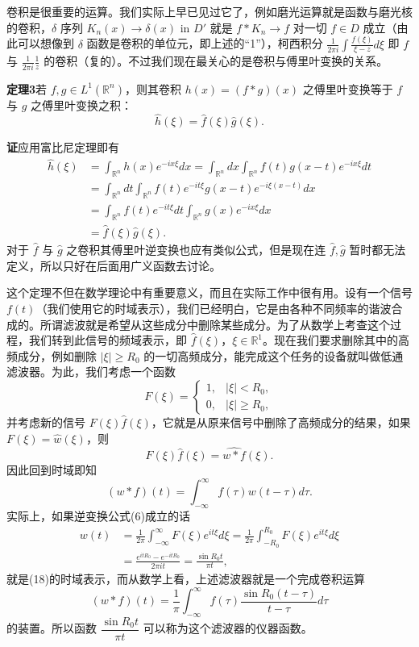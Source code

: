 卷积是很重要的运算。我们实际上早已见过它了，例如磨光运算就是函数与磨光核的卷积，$\delta$ 序列 $K_n(x)\to\delta(x)$ in $D'$ 就是 $f*K_n\to f$ 对一切 $f\in D$ 成立（由此可以想像到 $\delta$ 函数是卷积的单位元，即上述的“1”），柯西积分 $\frac1{2\pi i}\int\frac{f(\xi)}{\xi-z}d\xi$ 即 $f$ 与 $\frac1{2\pi i}\frac1z$ 的卷积（复的）。不过我们现在最关心的是卷积与傅里叶变换的关系。

\noindent\textbf{定理3}\quad 若 $f,g\in L^1(\mathbb R^n)$，则其卷积 $h(x)=(f*g)(x)$ 之傅里叶变换等于 $f$ 与 $g$ 之傅里叶变换之积：
\[
 \widehat h(\xi)=\widehat f(\xi)\widehat g(\xi).
\]

\noindent\textbf{证}\quad 应用富比尼定理即有
\[
 \begin{aligned}
 \widehat h(\xi)
 &=\int_{\mathbb R^n}h(x)e^{-ix\xi}dx
 =\int_{\mathbb R^n}dx\int_{\mathbb R^n}f(t)g(x-t)e^{-ix\xi}dt\\
 &=\int_{\mathbb R^n}dt\int_{\mathbb R^n}f(t)e^{-it\xi}g(x-t)e^{-i\xi(x-t)}dx\\
 &=\int_{\mathbb R^n}f(t)e^{-it\xi}dt\int_{\mathbb R^n}g(x)e^{-ix\xi}dx\\
 &=\widehat f(\xi)\widehat g(\xi).
 \end{aligned}
\]
对于 $\widehat f$ 与 $\widehat g$ 之卷积其傅里叶逆变换也应有类似公式，但是现在连 $\widehat f,\widehat g$ 暂时都无法定义，所以只好在后面用广义函数去讨论。

这个定理不但在数学理论中有重要意义，而且在实际工作中很有用。设有一个信号 $f(t)$（我们使用它的时域表示），我们已经明白，它是由各种不同频率的谐波合成的。所谓滤波就是希望从这些成分中删除某些成分。为了从数学上考查这个过程，我们转到此信号的频域表示，即 $\widehat f(\xi)$，$\xi\in\mathbb R^1$。现在我们要求删除其中的高频成分，例如删除 $|\xi|\ge R_0$ 的一切高频成分，能完成这个任务的设备就叫做低通滤波器。为此，我们考虑一个函数
\begin{equation}
 F(\xi)=\begin{cases}1,&|\xi|<R_0,\\0,&|\xi|\ge R_0,
 \end{cases}
 \tag{18}
\end{equation}
并考虑新的信号 $F(\xi)\widehat f(\xi)$，它就是从原来信号中删除了高频成分的结果，如果 $F(\xi)=\widehat w(\xi)$，则
\[
 F(\xi)\widehat f(\xi)=\widehat{w*f}(\xi).
\]
因此回到时域即知
\[
 (w*f)(t)=\int_{-\infty}^{\infty}f(\tau)w(t-\tau)d\tau.
\]
实际上，如果逆变换公式(6)成立的话
\[
 \begin{aligned}
 w(t)&=\frac1{2\pi}\int_{-\infty}^{\infty}F(\xi)e^{it\xi}d\xi
 =\frac1{2\pi}\int_{-R_0}^{R_0}F(\xi)e^{it\xi}d\xi\\
 &=\frac{e^{itR_0}-e^{-itR_0}}{2\pi it}
 =\frac{\sin R_0t}{\pi t},
 \end{aligned}
\]
就是(18)的时域表示，而从数学上看，上述滤波器就是一个完成卷积运算
\begin{equation}
 (w*f)(t)=\frac1\pi\int_{-\infty}^{\infty}f(\tau)\frac{\sin R_0(t-\tau)}{t-\tau}d\tau
 \tag{19}
\end{equation}
的装置。所以函数 $\dfrac{\sin R_0t}{\pi t}$ 可以称为这个滤波器的仪器函数。

